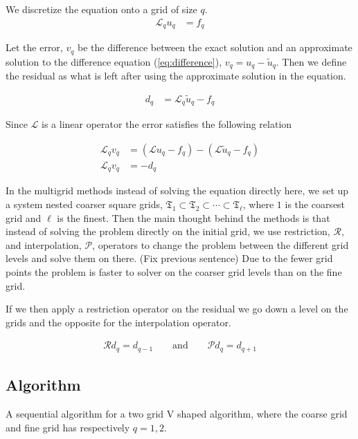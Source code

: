 		We discretize the equation onto a grid of size \(q\).
		\begin{align}
			\mathcal{L}_q u_q &= f_q \label{eq:difference}
		\end{align}

		Let the error, \(v_q\) be the difference between the exact solution and an approximate solution to the difference equation (\ref{eq:difference}), \( v_q = u_q - \tilde{u}_q \). Then we define the residual as what is left after using the approximate solution in the equation.

		\begin{align}
			d_q &= \mathcal{L}_q \tilde{u}_q - f_q
		\end{align}

		Since \(\mathcal{L}\) is a linear operator the error satisfies the following relation

		\begin{align}
			\mathcal{L}_q v_q &= (\mathcal{L}u_q - f_q) - (\mathcal{L}\tilde{u}_q  - f_q)
			\\
			\mathcal{L}_q v_q &= - d_q \label{eq:diff_MG}
		\end{align}

		In the multigrid methods instead of solving the equation directly here, we set up a system nested coarser square grids, \(\mathfrak{T}_1 \subset \mathfrak{T}_2 \subset \cdots \subset \mathfrak{T}_\ell\), where \(1\) is the coarsest grid and \(\ell\) is the finest. Then the main thought behind the methods is that instead of solving the problem directly on the initial grid, we use restriction, \( \mathcal{R} \), and interpolation, \( \mathcal{P} \), operators to change the problem between the different grid levels and solve them on there. (Fix previous sentence) Due to the fewer grid points the problem is faster to solver on the coarser grid levels than on the fine grid.

		If we then apply a restriction operator on the residual we go down a level on the grids and the opposite for the interpolation operator.

		\begin{align}
			\mathcal{R} d_q = d_{q-1} \qquad \text{and} \qquad \mathcal{P} d_q = d_{q + 1}  
		\end{align}


		\subsection{Algorithm}
			A sequential algorithm for a two grid V shaped algorithm, where the coarse grid and fine grid has respectively \(q = 1,2\).

